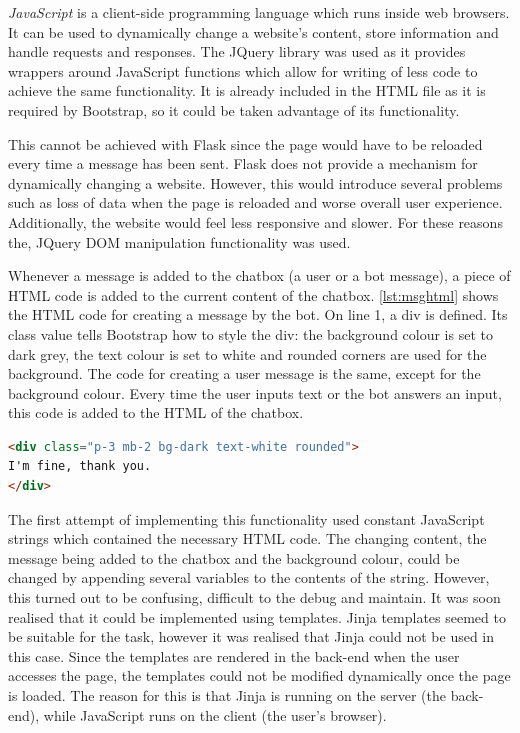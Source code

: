 \documentclass[12pt,a4paper]{article}
\newcommand{\captionstyle}[1] {
    \small{#1}
}
\begin{document}
\textit{JavaScript} is a client-side programming language which runs inside web browsers. It can be used to dynamically change a website's content, store information and handle requests and responses. The JQuery library was used as it provides wrappers around JavaScript functions which allow for writing of less code to achieve the same functionality. It is already included in the HTML file as it is required by Bootstrap, so it could be taken advantage of its functionality.

This cannot be achieved with Flask since the page would have to be reloaded every time a message has been sent. Flask does not provide a mechanism for dynamically changing a website. However, this would introduce several problems such as loss of data when the page is reloaded and worse overall user experience. Additionally, the website would feel less responsive and slower. For these reasons the, JQuery DOM manipulation functionality was used. 

Whenever a message is added to the chatbox (a user or a bot message), a piece of HTML code is added to the current content of the chatbox. \cref{lst:msghtml} shows the HTML code for creating a message by the bot. On line 1, a div is defined. Its class value tells Bootstrap how to style the div: the background colour is set to dark grey, the text colour is set to white and rounded corners are used for the background. The code for creating a user message is the same, except for the background colour. Every time the user inputs text or the bot answers an input, this code is added to the HTML of the chatbox.

\begin{lstlisting}[language=HTML, caption={\captionstyle{The HTML code used to create a chatbox message sent by the chatbot.}}, label={lst:msghtml}]
<div class="p-3 mb-2 bg-dark text-white rounded">
I'm fine, thank you.
</div>
\end{lstlisting}

The first attempt of implementing this functionality used constant JavaScript strings which contained the necessary HTML code. The changing content, the message being added to the chatbox and the background colour, could be changed by appending several variables to the contents of the string. However, this turned out to be confusing, difficult to the debug and maintain. It was soon realised that it could be implemented using templates. Jinja templates seemed to be suitable for the task, however it was realised that Jinja could not be used in this case. Since the templates are rendered in the back-end when the user accesses the page, the templates could not be modified dynamically once the page is loaded. The reason for this is that Jinja is running on the server (the back-end), while JavaScript runs on the client (the user’s browser).
\end{document}
